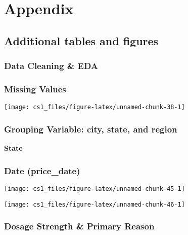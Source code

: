 \documentclass[
  11pt,
]{article}
\begin{document}
\newpage

\hypertarget{appendix}{%
\section{Appendix}\label{appendix}}

\hypertarget{additional-tables-and-figures}{%
\subsection{Additional tables and
figures}\label{additional-tables-and-figures}}

\hypertarget{data-cleaning-eda-1}{%
\subsubsection{Data Cleaning \& EDA}\label{data-cleaning-eda-1}}

\hypertarget{missing-values-1}{%
\subsubsection{Missing Values}\label{missing-values-1}}

\begin{center}\texttt{[image: cs1\_files/figure-latex/unnamed-chunk-38-1]} \end{center}

\hypertarget{grouping-variable-city-state-and-region-1}{%
\subsubsection{Grouping Variable: city, state, and
region}\label{grouping-variable-city-state-and-region-1}}

\textbf{State}

\hypertarget{date-price_date-1}{%
\subsubsection{Date (price\_date)}\label{date-price_date-1}}

\begin{center}\texttt{[image: cs1\_files/figure-latex/unnamed-chunk-45-1]} \end{center}

\begin{center}\texttt{[image: cs1\_files/figure-latex/unnamed-chunk-46-1]} \end{center}

\hypertarget{dosage-strength-primary-reason-1}{%
\subsubsection{Dosage Strength \& Primary
Reason}\label{dosage-strength-primary-reason-1}}
\end{document}
